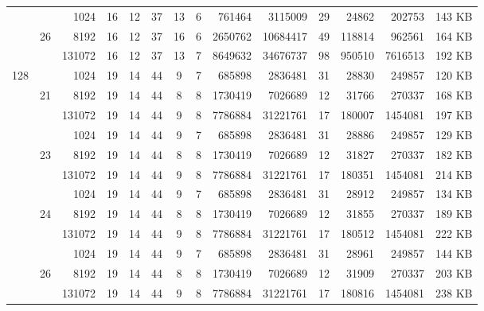 \begin{table}
\begin{tabular}{ccr|cc|cccrr|crr|c}
          &       &   1024   &        16 &    12 &        37 &    13 &       6 &       761464 &  3115009 &    29 &      24862 &  202753 & 143 KB \\
          &    26 &   8192   &        16 &    12 &        37 &    16 &       6 &      2650762 & 10684417 &    49 &     118814 &  962561 & 164 KB \\
          &       & 131072   &        16 &    12 &        37 &    13 &       7 &      8649632 & 34676737 &    98 &     950510 & 7616513 & 192 KB \\\midrule
      
      \multirow{ 12}{*}{128} 
          &       &   1024   &        19 &    14 &        44 &     9 &       7 &       685898 &  2836481 &    31 &      28830 &  249857 & 120 KB \\
          &    21 &   8192   &        19 &    14 &        44 &     8 &       8 &      1730419 &  7026689 &    12 &      31766 &  270337 & 168 KB \\
          &       & 131072   &        19 &    14 &        44 &     9 &       8 &      7786884 & 31221761 &    17 &     180007 & 1454081 & 197 KB \\\cline{2-14}

          &       &   1024   &        19 &    14 &        44 &     9 &       7 &       685898 &  2836481 &    31 &      28886 &  249857 & 129 KB \\
          &    23 &   8192   &        19 &    14 &        44 &     8 &       8 &      1730419 &  7026689 &    12 &      31827 &  270337 & 182 KB \\
          &       & 131072   &        19 &    14 &        44 &     9 &       8 &      7786884 & 31221761 &    17 &     180351 & 1454081 & 214 KB \\\cline{2-14}
      
          &       &   1024   &        19 &    14 &        44 &     9 &       7 &       685898 &  2836481 &    31 &      28912 &  249857 & 134 KB \\
          &    24 &   8192   &        19 &    14 &        44 &     8 &       8 &      1730419 &  7026689 &    12 &      31855 &  270337 & 189 KB \\
          &       & 131072   &        19 &    14 &        44 &     9 &       8 &      7786884 & 31221761 &    17 &     180512 & 1454081 & 222 KB \\\cline{2-14}
      
          &       &   1024   &        19 &    14 &        44 &     9 &       7 &       685898 &  2836481 &    31 &      28961 &  249857 & 144 KB \\
          &    26 &   8192   &        19 &    14 &        44 &     8 &       8 &      1730419 &  7026689 &    12 &      31909 &  270337 & 203 KB \\
          &       & 131072   &        19 &    14 &        44 &     9 &       8 &      7786884 & 31221761 &    17 &     180816 & 1454081 & 238 KB \\\bottomrule


\end{tabular}
\end{table}
